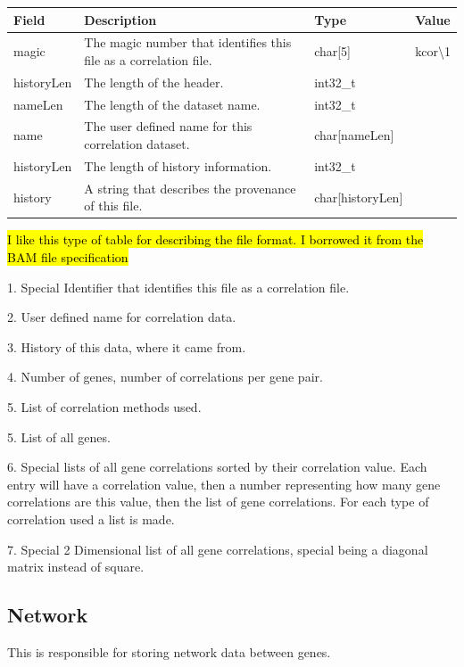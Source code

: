 \documentclass[10pt]{article}
\begin{document}
\begin{tabular}{| l | l | l | l |}
  \hline
  {\bfseries Field } & {\bfseries Description } & {\bfseries Type } & {\bfseries Value } \\ 
  \hline			
  magic & The magic number that identifies this file as a correlation file. & char[5] & kcor\textbackslash1 \\ 
  \hline
  historyLen & The length of the header. & int32\_t & \\
  \hline
  nameLen & The length of the dataset name. & int32\_t & \\
  \hline
  name & The user defined name for this correlation dataset. & char[nameLen] & \\
  \hline
  historyLen & The length of history information. & int32\_t & \\
  \hline
  history & A string that describes the provenance of this file. & char[historyLen] & \\
  \hline
\end{tabular}
\hl{I like this type of table for describing the file format. I borrowed it 
from the BAM file specification}
\begin{list}{}{}
\item[1.] Special Identifier that identifies this file as a correlation file.
\item[2.] User defined name for correlation data.
\item[3.] History of this data, where it came from.
\item[4.] Number of genes, number of correlations per gene pair.
\item[5.] List of correlation methods used.
\item[5.] List of all genes.
\item[6.] Special lists of all gene correlations sorted by their correlation 
value. Each entry will have a correlation value, then a number representing how 
many gene correlations are this value, then the list of gene correlations. For 
each type of correlation used a list is made.
\item[7.] Special 2 Dimensional list of all gene correlations, special being a 
diagonal matrix instead of square.
\end{list}

\subsection{Network}

This is responsible for storing network data between genes.
\end{document}
